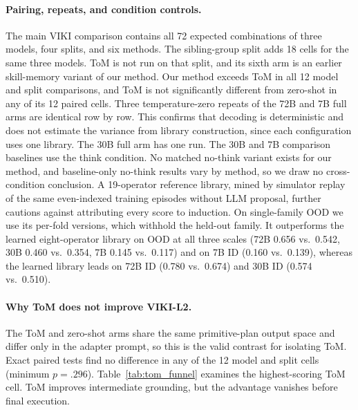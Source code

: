 \documentclass{article}
\theoremstyle{plain}
\theoremstyle{definition}
\theoremstyle{remark}
\begin{document}
\paragraph{Pairing, repeats, and condition controls.}
The main VIKI comparison contains all 72 expected combinations of three models, four splits, and six methods. The sibling-group split adds 18 cells for the same three models. ToM is not run on that split, and its sixth arm is an earlier skill-memory variant of our method. Our method exceeds ToM in all 12 model and split comparisons, and ToM is not significantly different from zero-shot in any of its 12 paired cells. Three temperature-zero repeats of the 72B and 7B full arms are identical row by row. This confirms that decoding is deterministic and does not estimate the variance from library construction, since each configuration uses one library. The 30B full arm has one run. The 30B and 7B comparison baselines use the think condition. No matched no-think variant exists for our method, and baseline-only no-think results vary by method, so we draw no cross-condition conclusion. A 19-operator reference library, mined by simulator replay of the same even-indexed training episodes without LLM proposal, further cautions against attributing every score to induction. On single-family OOD we use its per-fold versions, which withhold the held-out family. It outperforms the learned eight-operator library on OOD at all three scales (72B 0.656 vs.\ 0.542, 30B 0.460 vs.\ 0.354, 7B 0.145 vs.\ 0.117) and on 7B ID (0.160 vs.\ 0.139), whereas the learned library leads on 72B ID (0.780 vs.\ 0.674) and 30B ID (0.574 vs.\ 0.510).

\paragraph{Why ToM does not improve VIKI-L2.}
The ToM and zero-shot arms share the same primitive-plan output space and differ only in the adapter prompt, so this is the valid contrast for isolating ToM. Exact paired tests find no difference in any of the 12 model and split cells (minimum $p=.296$). Table~\ref{tab:tom_funnel} examines the highest-scoring ToM cell. ToM improves intermediate grounding, but the advantage vanishes before final execution.
\end{document}
